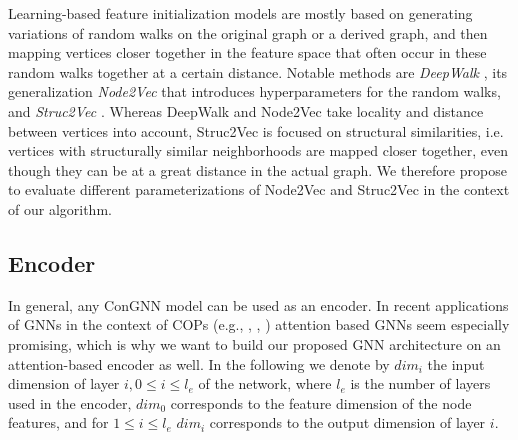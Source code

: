 \documentclass[draft,final]{vutinfth} %
\begin{document}
Learning-based feature initialization models are mostly based on generating variations of random walks on the original graph or a derived graph, and then mapping vertices closer together in the feature space that often occur in these random walks together at a certain distance. Notable methods are \emph{DeepWalk} \cite{Perozzi2014}, its generalization \emph{Node2Vec} \cite{GroverL16} that introduces hyperparameters for the random walks, and \emph{Struc2Vec} \cite{FigueiredoRS17}. Whereas DeepWalk and Node2Vec take locality and distance between vertices into account, Struc2Vec is focused on structural similarities, i.e. vertices with structurally similar neighborhoods are mapped closer together, even though they can be at a great distance in the actual graph. We therefore propose to evaluate different parameterizations of Node2Vec and Struc2Vec in the context of our algorithm. 

\subsection{Encoder}
In general, any ConGNN model can be used as an encoder. In recent applications of GNNs in the context of COPs (e.g., \cite{Kool2019}, \cite{Joshi2021}, \cite{Hudson2021}) attention based GNNs seem especially promising, which is why we want to build our proposed GNN architecture on an attention-based encoder as well. 
In the following we denote by $\mathit{dim}_i$ the input dimension of layer $i, 0 \leq i \leq l_e$ of the network, where $l_e$ is the number of layers used in the encoder, $dim_0$ corresponds to the feature dimension of the node features, and for $1 \leq i \leq l_e$ $\mathit{dim}_i$ corresponds to the output dimension of layer $i$. 

\end{document}

